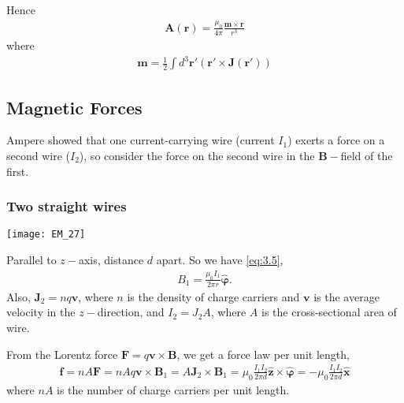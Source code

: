 \documentclass[a4paper]{article}
\begin{document}
Hence 
\begin{equation*}\tag{3.24} \label{eq:3.24}
\begin{aligned}
\mathbf{A}(\mathbf{r}) = \frac{\mu_0}{4\pi} \frac{\mathbf{m} \times \mathbf{r}}{r^3}
\end{aligned}
\end{equation*}
where 
\begin{equation*}\tag{3.25} \label{eq:3.25}
\begin{aligned}
\mathbf{m} = \frac{1}{2} \int d^3\mathbf{r}' (\mathbf{r}' \times \mathbf{J}(\mathbf{r}'))
\end{aligned}
\end{equation*}

\subsection{Magnetic Forces}
Ampere showed that one current-carrying wire (current $I_1$) exerts a force on a second wire ($I_2$), so consider the force on the second wire in the $\mathbf{B}-$field of the first.

\subsubsection{Two straight wires}

\texttt{[image: EM\_27]}

Parallel to $z-$axis, distance $d$ apart. So we have \eqref{eq:3.5},
\begin{equation*}
\begin{aligned}
B_1 = \frac{\mu_0 I_1}{2\pi r} \hat{\mathbf{\varphi}}.
\end{aligned}
\end{equation*}
Also, $\mathbf{J}_2 = nq\mathbf{v}$, where $n$ is the density of charge carriers and $\mathbf{v}$ is the average velocity in the $z-$direction, and $I_2 = J_2 A$, where $A$ is the cross-sectional area of wire.

From the Lorentz force $\mathbf{F} = q\mathbf{v} \times \mathbf{B}$, we get a force law per unit length,
\begin{equation*}\tag{3.26} \label{eq:3.26}
\begin{aligned}
\mathbf{f} = nA \mathbf{F} = nAq\mathbf{v} \times \mathbf{B}_1 = A\mathbf{J}_2 \times \mathbf{B}_1 = \mu_0 \frac{I_1 I_2}{2\pi d} \hat{\mathbf{z}} \times \hat{\mathbf{\varphi}} = -\mu_0 \frac{I_1I_2}{2\pi d} \hat{\mathbf{x}}
\end{aligned}
\end{equation*}
where $nA$ is the number of charge carriers per unit length.
\end{document}
